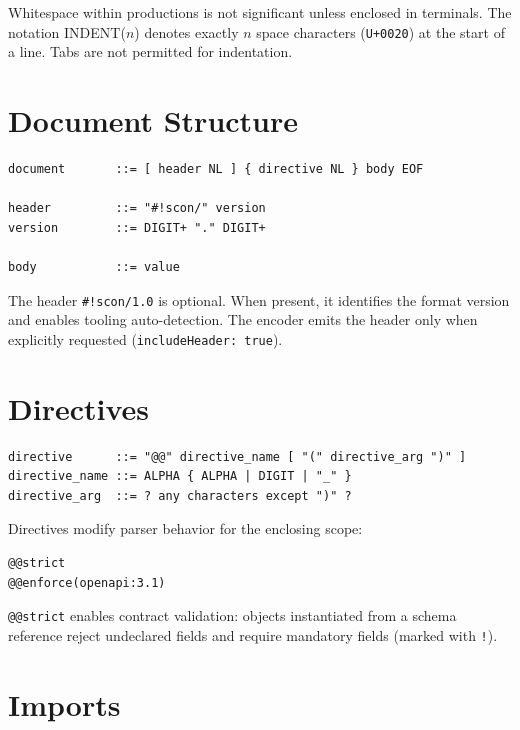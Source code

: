 \documentclass[11pt, a4paper]{article}
\begin{document}
\medskip
\noindent Whitespace within productions is not significant unless enclosed in terminals.
The notation \textsc{INDENT}($n$) denotes exactly $n$ space characters (\texttt{U+0020})
at the start of a line. Tabs are not permitted for indentation.

\section{Document Structure}
\label{sec:document}

\begin{lstlisting}[style=ebnf]
document       ::= [ header NL ] { directive NL } body EOF

header         ::= "#!scon/" version
version        ::= DIGIT+ "." DIGIT+

body           ::= value
\end{lstlisting}

\noindent The header \texttt{\#!scon/1.0} is optional. When present, it identifies
the format version and enables tooling auto-detection. The encoder emits the header
only when explicitly requested (\texttt{includeHeader: true}).

\section{Directives}
\label{sec:directives}

\begin{lstlisting}[style=ebnf]
directive      ::= "@@" directive_name [ "(" directive_arg ")" ]
directive_name ::= ALPHA { ALPHA | DIGIT | "_" }
directive_arg  ::= ? any characters except ")" ?
\end{lstlisting}

\noindent Directives modify parser behavior for the enclosing scope:

\begin{lstlisting}[style=scon]
@@strict
@@enforce(openapi:3.1)
\end{lstlisting}

\noindent \texttt{@@strict} enables contract validation: objects instantiated from
a schema reference reject undeclared fields and require mandatory fields
(marked with \texttt{!}).

\section{Imports}
\label{sec:imports}
\end{document}
